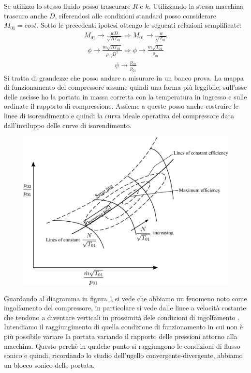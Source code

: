 Se utilizzo lo stesso fluido posso trascurare $R$ e $k$. Utilizzando la stessa macchina trascuro anche $D$, riferendosi alle condizioni standard posso considerare $M_{01}=cost$. Sotto le precedenti ipotesi ottengo le seguenti relazioni semplificate:
\begin{align*}
M_{01} \to \frac{w D}{\sqrt{R T_{01}}} \Rightarrow M_{01} \to \frac{w}{\sqrt{T_{01}}}
\end{align*}
\begin{align*}
\phi \to \frac{\dot{m} \sqrt{RT_{01}}}{\rho_{01} D^2} \Rightarrow \phi \to \frac{\dot{m} \sqrt{T_{01}}}{\rho_{01}}
\end{align*}
\begin{align*}
\psi \to \frac{p_{02}}{p_{01}}
\end{align*}
Si tratta di grandezze che posso andare a misurare in un banco prova. 
La mappa di funzionamento del compressore assume quindi una forma più leggibile, sull'asse delle ascisse ho la portata in massa corretta con la temperatura in ingresso e sulle ordinate il rapporto di compressione. Assieme a queste posso anche costruire le linee di isorendimento  e quindi la curva ideale operativa del compressore data dall'inviluppo delle curve di isorendimento.
\begin{figure}
\centering
  \includegraphics[width=.8\textwidth]{fig/secondo_8.pdf}
\caption{}
\label{fig:secondo_8}
\end{figure}
Guardando al diagramma in figura \ref{fig:secondo_8} si vede che abbiamo un fenomeno noto come ingolfamento del compressore, in particolare si vede dalle linee a velocità costante che tendono a diventare verticali in prossimità dele condizioni di ingolfamento . Intendiamo il raggiungimento di quella condizione di funzionamento in cui non è più possibile variare la portata variando il rapporto delle pressioni attorno alla macchina.
Questo perchè in qualche punto si raggiungono le condizioni di flusso sonico e quindi, ricordando lo studio dell’ugello convergente-divergente, abbiamo un
blocco sonico delle portata.

